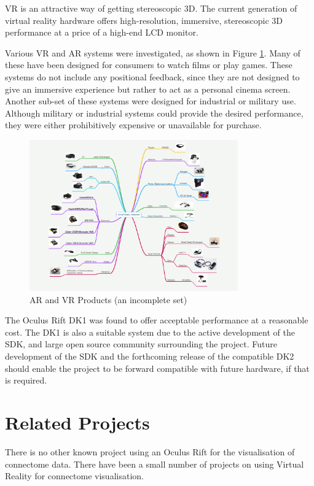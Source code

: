 \documentclass[MSc,paper=a4,pagesize=auto]{icldt}
\begin{document}
VR is an attractive way of getting stereoscopic 3D. The current generation of virtual reality hardware offers high-resolution, immersive, stereoscopic 3D performance at a price of a high-end LCD monitor. 

Various VR and AR systems were investigated, as shown in Figure \ref{fig:vr_headsets}. Many of these have been designed for consumers to watch films or play games. These systems do not include any positional feedback, since they are not designed to give an immersive experience but rather to act as a personal cinema screen. Another sub-set of these systems were designed for industrial or military use. Although military or industrial systems could provide the desired performance, they were either prohibitively expensive or unavailable for purchase. 

\begin{figure}[htbp!]
    \centering
    \includegraphics[width=0.8\textwidth]{resources/vr_headsets}
    \caption{AR and VR Products (an incomplete set)}
    \label{fig:vr_headsets}
\end{figure}

The Oculus Rift DK1 was found to offer acceptable performance at a reasonable cost. The DK1 is also a suitable system due to the active development of the SDK, and large open source community surrounding the project. Future development of the SDK and the forthcoming release of the compatible DK2 should enable the project to be forward compatible with future hardware, if that is required.
\section{Related Projects}
There is no other known project using an Oculus Rift for the visualisation of connectome data. There have been a small number of projects on using Virtual Reality for connectome visualisation. 
\end{document}
